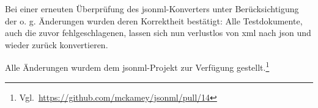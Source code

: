 Bei einer erneuten Überprüfung des \acrshort{jsonml}-Konverters unter Berücksichtigung der o. g. Änderungen wurden deren Korrektheit bestätigt: Alle Testdokumente, auch die zuvor fehlgeschlagenen, lassen sich nun verlustlos von \acrshort{xml} nach \acrshort{json} und wieder zurück konvertieren.

Alle Änderungen wurdem dem \acrshort{jsonml}-Projekt zur Verfügung gestellt.\footnote{Vgl.~\url{https://github.com/mckamey/jsonml/pull/14}}
